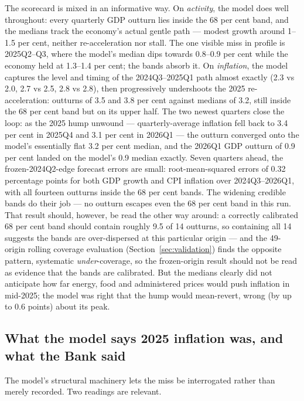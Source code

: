 The scorecard is mixed in an informative way. On \emph{activity}, the model does well throughout: every quarterly GDP outturn lies inside the 68 per cent band, and the medians track the economy's actual gentle path --- modest growth around 1--1.5 per cent, neither re-acceleration nor stall. The one visible miss in profile is 2025Q2--Q3, where the model's median dips towards 0.8--0.9 per cent while the economy held at 1.3--1.4 per cent; the bands absorb it. On \emph{inflation}, the model captures the level and timing of the 2024Q3--2025Q1 path almost exactly (2.3 vs 2.0, 2.7 vs 2.5, 2.8 vs 2.8), then progressively undershoots the 2025 re-acceleration: outturns of 3.5 and 3.8 per cent against medians of 3.2, still inside the 68 per cent band but on its upper half. The two newest quarters close the loop: as the 2025 hump unwound --- quarterly-average inflation fell back to 3.4 per cent in 2025Q4 and 3.1 per cent in 2026Q1 --- the outturn converged onto the model's essentially flat 3.2 per cent median, and the 2026Q1 GDP outturn of 0.9 per cent landed on the model's 0.9 median exactly. Seven quarters ahead, the frozen-2024Q2-edge forecast errors are small: root-mean-squared errors of 0.32 percentage points for both GDP growth and CPI inflation over 2024Q3--2026Q1, with all fourteen outturns inside the 68 per cent bands. The widening credible bands do their job --- no outturn escapes even the 68 per cent band in this run. That result should, however, be read the other way around: a correctly calibrated 68 per cent band should contain roughly 9.5 of 14 outturns, so containing all 14 suggests the bands are over-dispersed at this particular origin --- and the 49-origin rolling coverage evaluation (Section~\ref{sec:validation}) finds the opposite pattern, systematic \emph{under}-coverage, so the frozen-origin result should not be read as evidence that the bands are calibrated. But the medians clearly did not anticipate how far energy, food and administered prices would push inflation in mid-2025; the model was right that the hump would mean-revert, wrong (by up to 0.6 points) about its peak.

\subsection{What the model says 2025 inflation was, and what the Bank said}

The model's structural machinery lets the miss be interrogated rather than merely recorded. Two readings are relevant.

